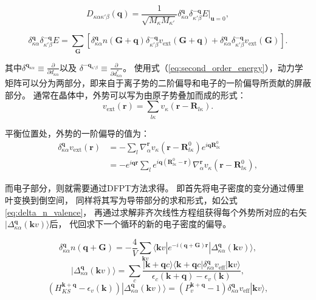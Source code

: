 \begin{equation}\label{eq:Dmatrix}
  D_{\kappa\alpha\kappa'\beta}(\bm{q}) =
  \frac{1}{\sqrt{M_\kappa M_{\kappa'}}} \delta^{\bm{q}}_{\kappa\alpha} \delta^{-\bm{q}}_{\kappa'\beta} E \bigg|_{\bm{u}=0} ,
\end{equation}

\begin{equation}\label{eq:Edd}
  \delta^{\bm{q}}_{\kappa\alpha}\delta^{-\bm{q}}_{\kappa'\beta} E =
  \sum_{\bm{G}} [ \delta^{\bm{q}}_{\kappa\alpha}n(\bm{G}+\bm{q})\delta^{\bm{-q}}_{\kappa'\beta}v_\mathrm{ext}(\bm{G}+\bm{q}) + \delta^{\bm{q}}_{\kappa\alpha}\delta^{\bm{-q}}_{\kappa'\beta} v_\mathrm{ext}(\bm{G})] .
\end{equation}

其中$\delta^{\bm{q}_{\kappa\alpha}}\equiv \frac{\partial}{\partial d_{\kappa\alpha}}$以及
$\delta^{\bm{-q}_{\kappa'\beta}}\equiv \frac{\partial}{\partial d^*_{\kappa\alpha}}$。
使用式（\ref{eq:second_order_energy}），动力学矩阵可以分为两部分，即来自于离子势的二阶偏导和电子的一阶偏导所贡献的屏蔽部分。
通常在晶体中，外势可以写为由原子势叠加而成的形式：
\begin{equation}
  v_\mathrm{ext}(\bm{r}) = \sum_{l\kappa} v_\kappa (\bm{r}-\bm{R}_{l\kappa}).
\end{equation}

平衡位置处，外势的一阶偏导的值为：
\begin{align}
  \delta^{\bm{q}}_{\kappa\alpha}v_{\mathrm{ext}}(\bm{r}) &=
  - \sum_l \nabla^{\bm{r}}_\alpha v_\kappa (\bm{r}-\bm{R}^0_{l\kappa})e^{i\bm{q}\bm{R}^0_{l\kappa}} \\
  &= -e^{i\bm{qr}} \sum_l e^{i\bm{q} (\bm{R}^0_{l\kappa}-\bm{r})} \nabla^{\bm{r}}_\alpha v_\kappa(\bm{r}-\bm{R}^0_{l\kappa}) ,
\end{align}

而电子部分，则就需要通过DFPT方法求得。
即首先将电子密度的变分通过傅里叶变换到倒空间，
同样将其写为导带部分的求和形式，如公式\ref{eq:delta_n_valence}，
再通过求解非齐次线性方程组获得每个外势所对应的右矢$| \Delta^{\bm{q}}_{\kappa\alpha}(\bm{k}v) \rangle$后，
代回求下一个循环的新的电子密度的偏导。

\begin{equation}\label{eq:dfpt_scf01}
  \delta^{\bm{q}}_{\kappa\alpha} n(\bm{q}+\bm{G}) = - \frac{4}{V}\sum_{\bm{k}v} \langle \bm{k}v| e^{-i(\bm{q}+\bm{G})\bm{r}}| \Delta^{\bm{q}}_{\kappa\alpha}(\bm{k}v) \rangle ,
\end{equation}
\begin{equation}\label{eq:dfpt_scf02}
  | \Delta^{\bm{q}}_{\kappa\alpha}(\bm{k}v) \rangle =
  \sum_c \frac{|\bm{k}+\bm{q}c\rangle \langle \bm{k}+\bm{q}c | \delta^{\bm{q}}_{\kappa\alpha} v_\mathrm{eff} | \bm{k}v \rangle}
  {\epsilon_c(\bm{k}+\bm{q})-\epsilon_v(\bm{k})} ,
\end{equation}
\begin{equation}\label{eq:dfpt_scf03}
  (H^{\bm{k}+\bm{q}}_{KS}-\epsilon_v(\bm{k}))|\Delta^{\bm{q}}_{\kappa\alpha}(\bm{k}v)\rangle =
  (P^{\bm{k}+\bm{q}}_v-1)\delta^{\bm{q}}_{\kappa\alpha}v_\mathrm{eff}|\bm{k}v\rangle ,
\end{equation}

